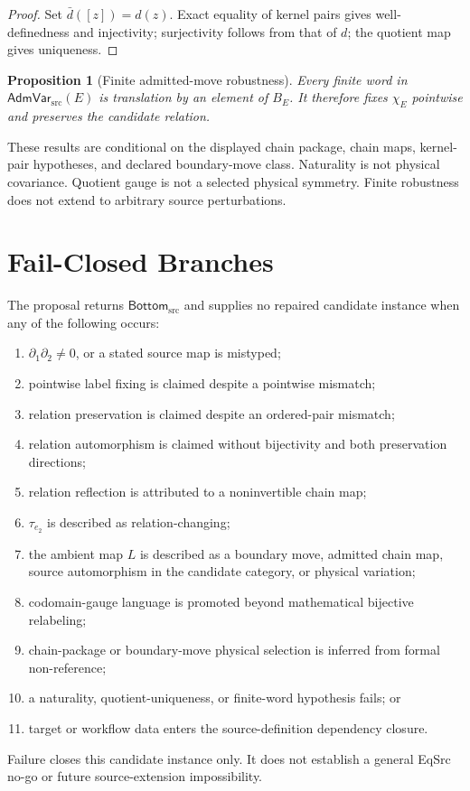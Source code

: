 \documentclass[11pt]{article}
\newtheorem{proposition}{Proposition}
\newcommand{\AdmVar}{\mathsf{AdmVar}_{\mathrm{src}}}
\newcommand{\Bottom}{\mathsf{Bottom}_{\mathrm{src}}}
\begin{document}
\begin{proof}
Set \(\bar d([z])=d(z)\). Exact equality of kernel pairs gives
well-definedness and injectivity; surjectivity follows from that of \(d\);
the quotient map gives uniqueness.
\end{proof}

\begin{proposition}[Finite admitted-move robustness]
Every finite word in \(\AdmVar(E)\) is translation by an element of \(B_E\).
It therefore fixes \(\chi_E\) pointwise and preserves the candidate relation.
\end{proposition}

These results are conditional on the displayed chain package, chain maps,
kernel-pair hypotheses, and declared boundary-move class. Naturality is not
physical covariance. Quotient gauge is not a selected physical symmetry.
Finite robustness does not extend to arbitrary source perturbations.

\section{Fail-Closed Branches}

The proposal returns \(\Bottom\) and supplies no repaired candidate instance
when any of the following occurs:
\begin{enumerate}[leftmargin=*]
  \item \(\partial_1\partial_2\neq0\), or a stated source map is mistyped;
  \item pointwise label fixing is claimed despite a pointwise mismatch;
  \item relation preservation is claimed despite an ordered-pair mismatch;
  \item relation automorphism is claimed without bijectivity and both
  preservation directions;
  \item relation reflection is attributed to a noninvertible chain map;
  \item \(\tau_{e_2}\) is described as relation-changing;
  \item the ambient map \(L\) is described as a boundary move, admitted chain
  map, source automorphism in the candidate category, or physical variation;
  \item codomain-gauge language is promoted beyond mathematical bijective
  relabeling;
  \item chain-package or boundary-move physical selection is inferred from
  formal non-reference;
  \item a naturality, quotient-uniqueness, or finite-word hypothesis fails; or
  \item target or workflow data enters the source-definition dependency
  closure.
\end{enumerate}
Failure closes this candidate instance only. It does not establish a general
EqSrc no-go or future source-extension impossibility.
\end{document}
